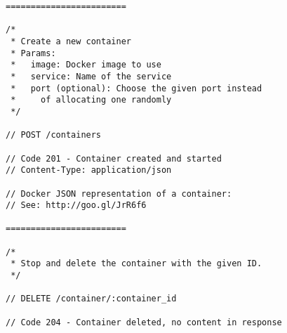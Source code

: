 \begin{lstlisting}
========================

/*
 * Create a new container
 * Params:
 *   image: Docker image to use
 *   service: Name of the service
 *   port (optional): Choose the given port instead
 *     of allocating one randomly
 */

// POST /containers

// Code 201 - Container created and started
// Content-Type: application/json

// Docker JSON representation of a container:
// See: http://goo.gl/JrR6f6

========================

/*
 * Stop and delete the container with the given ID.
 */

// DELETE /container/:container_id

// Code 204 - Container deleted, no content in response
\end{lstlisting}

